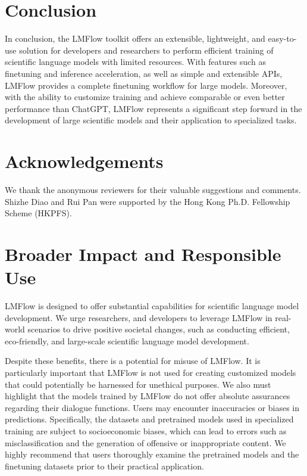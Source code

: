\documentclass[11pt]{article}
\begin{document}
\section{Conclusion}
In conclusion, the LMFlow toolkit offers an extensible, lightweight, and easy-to-use solution for developers and researchers to perform efficient training of scientific language models with limited resources. 
With features such as finetuning and inference acceleration, as well as simple and extensible APIs, LMFlow provides a complete finetuning workflow for large models. 
Moreover, with the ability to customize training and achieve comparable or even better performance than ChatGPT, LMFlow represents a significant step forward in the development of large scientific models and their application to specialized tasks.



\section*{Acknowledgements}
We thank the anonymous reviewers for their valuable suggestions and comments.
Shizhe Diao and Rui Pan were supported by the Hong Kong Ph.D. Fellowship Scheme (HKPFS).


\section*{Broader Impact and Responsible Use}
LMFlow is designed to offer substantial capabilities for scientific language model development.
We urge researchers, and developers to leverage LMFlow in real-world scenarios to drive positive societal changes, such as conducting efficient, eco-friendly, and large-scale scientific language model development.

Despite these benefits, there is a potential for misuse of LMFlow. 
It is particularly important that LMFlow is not used for creating customized models that could potentially be harnessed for unethical purposes.
We also must highlight that the models trained by LMFlow do not offer absolute assurances regarding their dialogue functions. 
Users may encounter inaccuracies or biases in predictions. 
Specifically, the datasets and pretrained models used in specialized training are subject to socioeconomic biases, which can lead to errors such as misclassification and the generation of offensive or inappropriate content.
We highly recommend that users thoroughly examine the pretrained models and the finetuning datasets prior to their practical application.
\end{document}
